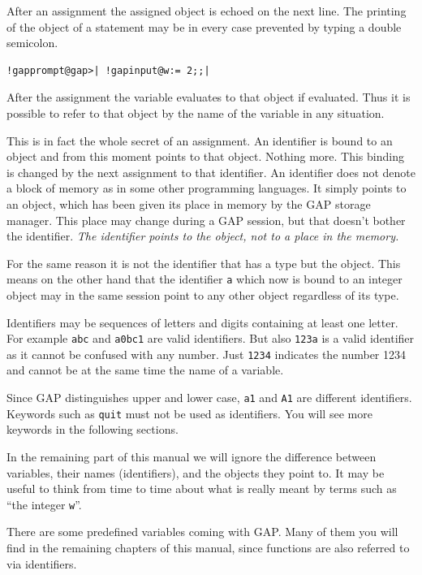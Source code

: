 \documentclass[a4paper,11pt]{report}
\begin{document}
{{ After an assignment the assigned object is echoed on the next line. The
printing of the object of a statement may be in every case prevented by typing
a double semicolon. 

 
\begin{Verbatim}[commandchars=!@|,fontsize=\small,frame=single,label=Example]
  !gapprompt@gap>| !gapinput@w:= 2;;|
\end{Verbatim}
 

 After the assignment the variable evaluates to that object if evaluated. Thus
it is possible to refer to that object by the name of the variable in any
situation. 

 This is in fact the whole secret of an assignment. An identifier is bound to
an object and from this moment points to that object. Nothing more. This
binding is changed by the next assignment to that identifier. An identifier
does not denote a block of memory as in some other programming languages. It
simply points to an object, which has been given its place in memory by the \textsf{GAP} storage manager. This place may change during a \textsf{GAP} session, but that doesn't bother the identifier. \emph{The identifier points to the object, not to a place in the memory.} 

 For the same reason it is not the identifier that has a type but the object.
This means on the other hand that the identifier \texttt{a} which now is bound to an integer object may in the same session point to any
other object regardless of its type. 

 Identifiers may be sequences of letters and digits containing at least one
letter. For example \texttt{abc} and \texttt{a0bc1} are valid identifiers. But also \texttt{123a} is a valid identifier as it cannot be confused with any number. Just \texttt{1234} indicates the number 1234 and cannot be at the same time the name of a
variable. 

 Since \textsf{GAP} distinguishes upper and lower case, \texttt{a1} and \texttt{A1} are different identifiers. Keywords such as \texttt{quit} must not be used as identifiers. You will see more keywords in the following
sections. 

 In the remaining part of this manual we will ignore the difference between
variables, their names (identifiers), and the objects they point to. It may be
useful to think from time to time about what is really meant by terms such as ``the integer \texttt{w}''. 

 There are some predefined variables coming with \textsf{GAP}. Many of them you will find in the remaining chapters of this manual, since
functions are also referred to via identifiers. 

}}
\end{document}
